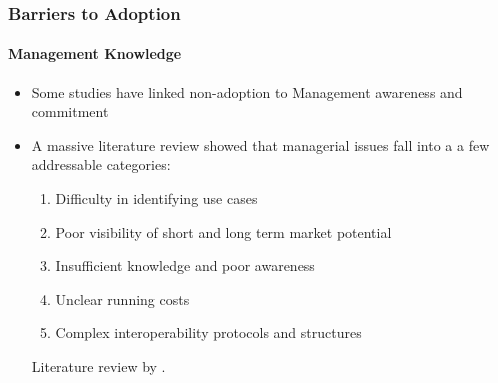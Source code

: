 \begin{frame}
  \frametitle{Barriers to Adoption}
  \framesubtitle{Management Knowledge}
  \begin{itemize}
    \item <1-> Some studies have linked non-adoption to Management awareness and commitment
          \item <1-> A massive literature review showed that managerial issues fall into a a few addressable categories:

          \begin{enumerate}
            \item <2-> Difficulty in identifying use cases
            \item <3-> Poor visibility of short and long term market potential
            \item <4-> Insufficient knowledge and poor awareness
            \item <5-> Unclear running costs
            \item <6-> Complex interoperability protocols and structures
          \end{enumerate}
           {\scriptsize{Literature review by \textcite{upadhyayDemystifyingBlockchainCritical2020}.}}

  \end{itemize}
\end{frame}

